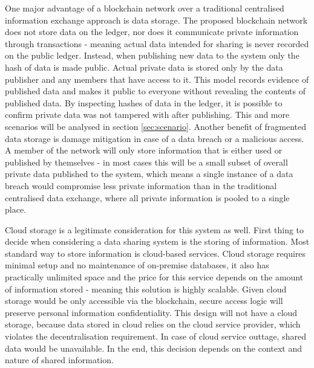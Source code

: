 \documentclass[12pt]{article}
\begin{document}
    One major advantage of a blockchain network over a traditional centralised information exchange approach is data storage. The proposed blockchain network does not store data on the ledger, nor does it communicate private information through transactions - meaning actual data intended for sharing is never recorded on the public ledger. Instead, when publishing new data to the system only the hash of data is made public. Actual private data is stored only by the data publisher and any members that have access to it. This model records evidence of published data and makes it public to everyone without revealing the contents of published data. By inspecting hashes of data in the ledger, it is possible to confirm private data was not tampered with after publishing. This and more scenarios will be analysed in section \ref{sec:scenario}. Another benefit of fragmented data storage is damage mitigation in case of a data breach or a malicious access. A member of the network will only store information that is either used or published by themselves - in most cases this will be a small subset of overall private data published to the system, which means a single instance of a data breach would compromise less private information than in the traditional centralised data exchange, where all private information is pooled to a single place.
    
    Cloud storage is a legitimate consideration for this system as well. First thing to decide when considering a data sharing system is the storing of information. Most standard way to store information is cloud-based services. Cloud storage requires minimal setup and no maintenance of on-premise databases, it also has practically unlimited space and the price for this service depends on the amount of information stored - meaning this solution is highly scalable. Given cloud storage would be only accessible via the blockchain, secure access logic will preserve personal information confidentiality. This design will not have a cloud storage, because data stored in cloud relies on the cloud service provider, which violates the decentralisation requirement. In case of cloud service outtage, shared data would be unavailable. In the end, this decision depends on the context and nature of shared information.
    
\end{document}
